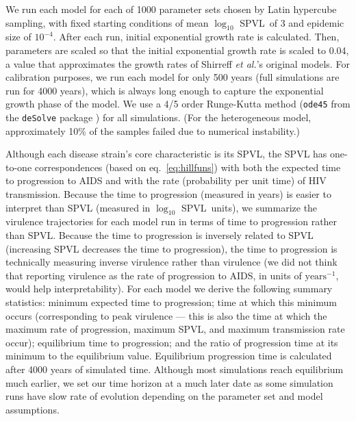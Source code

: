 \documentclass[10pt,letterpaper]{article}
\newcommand{\Lspvl}{$\log_{10}$ SPVL}
\newcommand{\etal}{\textit{et al.}}
\begin{document}
We run each model for each of 1000 parameter sets chosen by Latin hypercube sampling, with fixed starting conditions
of mean \Lspvl\ of 3 and epidemic size of $10^{-4}$. After each run, initial exponential growth rate is calculated. Then, parameters are scaled so that the initial exponential growth rate is scaled to 0.04, a value that approximates the growth rates of Shirreff \etal's original models.
For calibration purposes, we run each model for only 500 years
(full simulations are run for 4000 years), which is always long
enough to capture the exponential growth phase of the model. 
We use a 4/5 order 
Runge-Kutta method (\texttt{ode45} from the \texttt{deSolve} package
\cite{soetaert_solving_2010}) for all simulations. 
(For the heterogeneous model, approximately
10\% of the samples failed due to numerical instability.)

Although each disease strain's core characteristic is its SPVL, the
SPVL has one-to-one correspondences (based on eq.~\ref{eq:hillfuns})
with both the expected time to progression to AIDS and with the rate
(probability per unit time) of HIV transmission. Because the time to
progression (measured in years) is easier to interpret than
SPVL (measured in \Lspvl\ units), we summarize the virulence
trajectories for each model run in terms of time to progression
rather than SPVL. Because the  time to progression is inversely
related to SPVL (increasing SPVL decreases the time to progression),
the time to progression is technically measuring inverse
virulence rather than virulence (we did not think that 
reporting virulence as the rate of progression to AIDS, in units
of $\textrm{years}^{-1}$, would help interpretability).
For each model we derive the following summary statistics:
minimum expected time to progression;
time at which this minimum occurs
(corresponding to peak virulence --- this is also the time at which the
maximum rate of progression, maximum SPVL, and maximum transmission rate
occur); equilibrium time to progression; 
and the ratio of progression time at its minimum to the equilibrium
value. Equilibrium progression time is calculated after 4000 years of simulated
time. Although most simulations reach equilibrium much earlier, we set our time horizon at a much later date as some simulation runs have slow rate of evolution depending on the parameter set and model assumptions.
\end{document}
